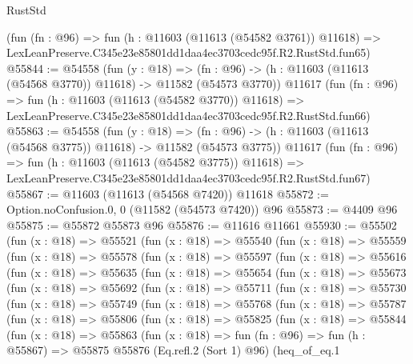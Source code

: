 \begin{lexlean}{RustStd}
\begin{coremodule}
    (fun (fn : @96) =>
    fun (h : @11603 (@11613 (@54582 @3761)) @11618) =>
    LexLeanPreserve.C345e23e85801dd1daa4ec3703cedc95f.R2.RustStd.fun65)
@55844 := @54558
    (fun (y : @18) =>
    (fn : @96) -> (h : @11603 (@11613 (@54568 @3770)) @11618) -> @11582 (@54573 @3770))
    @11617
    (fun (fn : @96) =>
    fun (h : @11603 (@11613 (@54582 @3770)) @11618) =>
    LexLeanPreserve.C345e23e85801dd1daa4ec3703cedc95f.R2.RustStd.fun66)
@55863 := @54558
    (fun (y : @18) =>
    (fn : @96) -> (h : @11603 (@11613 (@54568 @3775)) @11618) -> @11582 (@54573 @3775))
    @11617
    (fun (fn : @96) =>
    fun (h : @11603 (@11613 (@54582 @3775)) @11618) =>
    LexLeanPreserve.C345e23e85801dd1daa4ec3703cedc95f.R2.RustStd.fun67)
@55867 := @11603 (@11613 (@54568 @7420)) @11618
@55872 := Option.noConfusion.{0, 0} (@11582 (@54573 @7420)) @96
@55873 := @4409 @96
@55875 := @55872 @55873 @96
@55876 := @11616 @11661
@55930 := @55502
    (fun (x : @18) =>
    @55521
      (fun (x : @18) =>
      @55540
        (fun (x : @18) =>
        @55559
          (fun (x : @18) =>
          @55578
            (fun (x : @18) =>
            @55597
              (fun (x : @18) =>
              @55616
                (fun (x : @18) =>
                @55635
                  (fun (x : @18) =>
                  @55654
                    (fun (x : @18) =>
                    @55673
                      (fun (x : @18) =>
                      @55692
                        (fun (x : @18) =>
                        @55711
                          (fun (x : @18) =>
                          @55730
                            (fun (x : @18) =>
                            @55749
                              (fun (x : @18) =>
                              @55768
                                (fun (x : @18) =>
                                @55787
                                  (fun (x : @18) =>
                                  @55806
                                    (fun (x : @18) =>
                                    @55825
                                      (fun (x : @18) =>
                                      @55844
                                        (fun (x : @18) =>
                                        @55863
                                          (fun (x : @18) =>
                                          fun (fn : @96) =>
                                          fun (h : @55867) =>
                                          @55875
                                            @55876
                                            (Eq.refl.{2} (Sort 1) @96)
                                            (heq_of_eq.{1}

\end{coremodule}
\end{lexlean}

